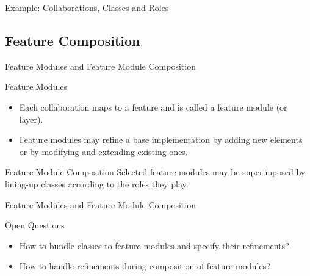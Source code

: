 \begin{frame}{Example: Collaborations, Classes and Roles}
	\begin{exampletight}{}
		\centering
	\end{exampletight}
\end{frame}

\subsection{Feature Composition}

\begin{frame}{Feature Modules and Feature Module Composition}
	\begin{mycolumns}[widths={65,35},animation=none]
		\begin{definition}{Feature Modules}
			\begin{itemize}
				\item Each collaboration maps to a feature and is called a feature module (or layer).
				\item Feature modules may refine a base implementation by adding new elements or by modifying and extending existing ones.
			\end{itemize}
		\end{definition}
	\mynextcolumn
		\begin{definition}{Feature Module Composition}
			Selected feature modules may be superimposed by lining-up classes according to the roles they play.
		\end{definition}
	\end{mycolumns}
	\begin{exampletight}{}
		\centering
	\end{exampletight}
\end{frame}

\begin{frame}{Feature Modules and Feature Module Composition}
	\begin{note}{Open Questions}
		\begin{itemize}
			\item How to bundle classes to feature modules and specify their refinements?
			\item How to handle refinements during composition of feature modules?
		\end{itemize}
	\end{note}
	\begin{exampletight}{}
		\centering
	\end{exampletight}
\end{frame}

